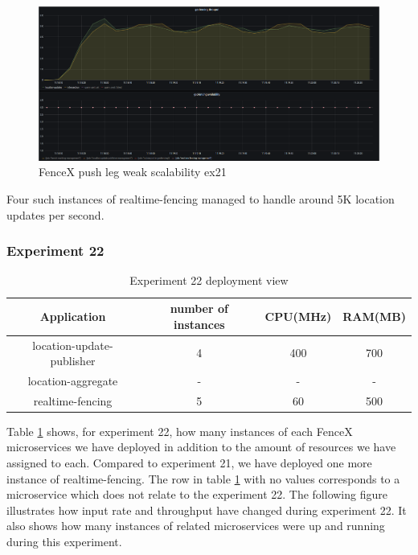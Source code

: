 \documentclass[a4]{report}
\begin{document}
    \begin{figure}[h!]
        \centering
        \caption{FenceX push leg weak scalability ex21}
        \label{fig:ex21}
        \includegraphics[width=\linewidth, scale=2]{images/evaluation/ex21-benchmarking-ongoing-1per6sec.png}
    \end{figure}
    Four such instances of realtime-fencing managed to handle around 5K location updates per second.

    \clearpage

    \subsubsection{Experiment 22}
    \begin{table}[h!]
        \centering
        \begin{tabular}{|c|c|c|c|}
            \hline
            Application               & number of instances & CPU(MHz) & RAM(MB) \\
            \hline
            location-update-publisher & 4                   & 400      & 700     \\
            location-aggregate        & -                   & -        & -       \\
            realtime-fencing          & 5                   & 60       & 500     \\
            \hline
        \end{tabular}
        \caption{Experiment 22 deployment view}
        \label{table:ex22-dv}
    \end{table}

    Table \ref{table:ex22-dv} shows, for experiment 22, how many instances of each FenceX microservices we have
    deployed in addition to the amount of resources we have assigned to each.
    Compared to experiment 21, we have deployed one more instance of realtime-fencing.
    The row in table \ref{table:ex22-dv} with no values corresponds to a microservice which does not relate to the
    experiment 22.
    The following figure illustrates how input rate and throughput have changed during experiment 22.
    It also shows how many instances of related microservices were up and running during this experiment.
\end{document}
